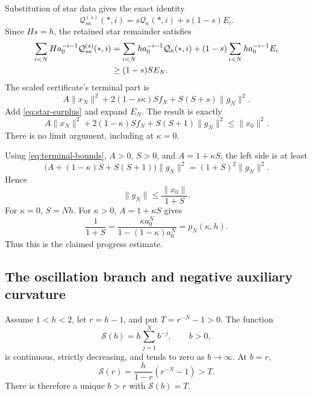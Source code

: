\documentclass[11pt]{article}
\numberwithin{equation}{section}
\theoremstyle{remark}
\newcommand{\norm}[1]{\lVert #1\rVert}
\newcommand{\Q}{\mathcal Q}
\begin{document}
Substitution of star data gives the exact identity
\begin{equation}
\Q^{(s)}_{s\kappa}(*,i)
=s\Q_\kappa(*,i)+s(1-s)E_i.
\label{eq:scaled-star}
\end{equation}
Since $Hs=h$, the retained star remainder satisfies
\begin{align}
\sum_{i<N}Ha_0^{-i-1}\Q^{(s)}_{s\kappa}(*,i)
&=\sum_{i<N}ha_0^{-i-1}\Q_\kappa(*,i)
 +(1-s)\sum_{i<N}ha_0^{-i-1}E_i\notag\\
&\geq(1-s)SE_N.
\label{eq:star-surplus}
\end{align}
The scaled certificate's terminal part is
\[
A\norm{x_N}^2+2(1-s\kappa)Sf_N+S(S+s)\norm{g_N}^2.
\]
Add \eqref{eq:star-surplus} and expand $E_N$. The result is exactly
\begin{equation}
A\norm{x_N}^2+2(1-\kappa)Sf_N
 +S(S+1)\norm{g_N}^2\leq\norm{x_0}^2.
\label{eq:progress-joint}
\end{equation}
There is no limit argument, including at $\kappa=0$.

Using \eqref{eq:terminal-bounds}, $A>0$, $S>0$, and $A=1+\kappa S$,
the left side is at least
\[
\bigl(A+(1-\kappa)S+S(S+1)\bigr)\norm{g_N}^2
=(1+S)^2\norm{g_N}^2.
\]
Hence
\begin{equation}
\norm{g_N}\leq\frac{\norm{x_0}}{1+S}.
\label{eq:progress-bound}
\end{equation}
For $\kappa=0$, $S=Nh$. For $\kappa>0$, $A=1+\kappa S$ gives
\[
\frac1{1+S}
=\frac{\kappa a_0^N}{1-(1-\kappa)a_0^N}=p_N(\kappa,h).
\]
Thus this is the claimed progress estimate.

\subsection{The oscillation branch and negative auxiliary curvature}

Assume $1<h<2$, let $r=h-1$, and put $T=r^{-N}-1>0$.
The function
\[
\mathcal S(b)=h\sum_{j=1}^Nb^{-j},\qquad b>0,
\]
is continuous, strictly decreasing, and tends to zero as $b\to\infty$.
At $b=r$,
\begin{equation}
\mathcal S(r)=\frac{h}{1-r}(r^{-N}-1)>T.
\label{eq:upper-IVT}
\end{equation}
There is therefore a unique $b>r$ with $\mathcal S(b)=T$.
\end{document}
